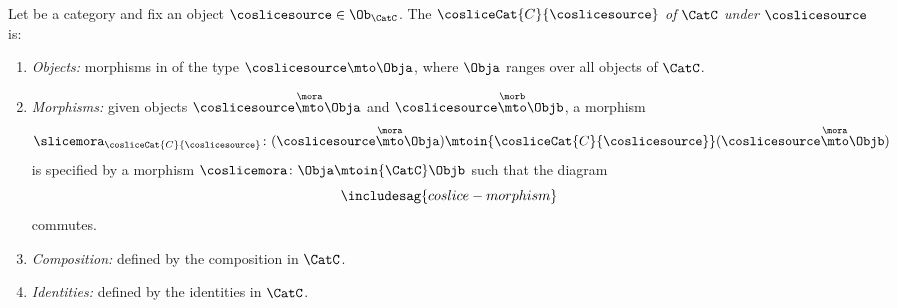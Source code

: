 \begin{ctdefinition}
    \label{def:coslice-category}

    Let \CatC be a category and fix an object $\coslicesource \in \Ob_\CatC$.
    The  $\cosliceCat{C}{\coslicesource}$ \emph{of} $\CatC$ \emph{under} $\coslicesource$ is:
    \begin{enumerate}
        \item \emph{Objects:} morphisms in \CatC of the type $\coslicesource \mto \Obja$, where $\Obja$ ranges over all objects of $\CatC$.
        \item \emph{Morphisms:} given objects $\coslicesource \overset{\mora}{\mto} \Obja$ and $\coslicesource  \overset{\morb}{\mto} \Objb$, a morphism
              \begin{equation}
                \slicemora_{\cosliceCat{C}{\coslicesource}} \colon (\coslicesource \overset{\mora}{\mto} \Obja) 
                \mtoin{\cosliceCat{C}{\coslicesource}} 
                (\coslicesource \overset{\mora}{\mto} \Objb)
            \end{equation}
              is specified by a morphism $\coslicemora \colon \Obja \mtoin{\CatC} \Objb$ such that the diagram
              \begin{equation}\label{eq:coslice-morphism}
                  \includesag{coslice-morphism}
              \end{equation}
              commutes.

        \item \emph{Composition:} defined by the composition in $\CatC$.
        \item \emph{Identities:} defined by the identities in $\CatC$.
    \end{enumerate}
\end{ctdefinition}

